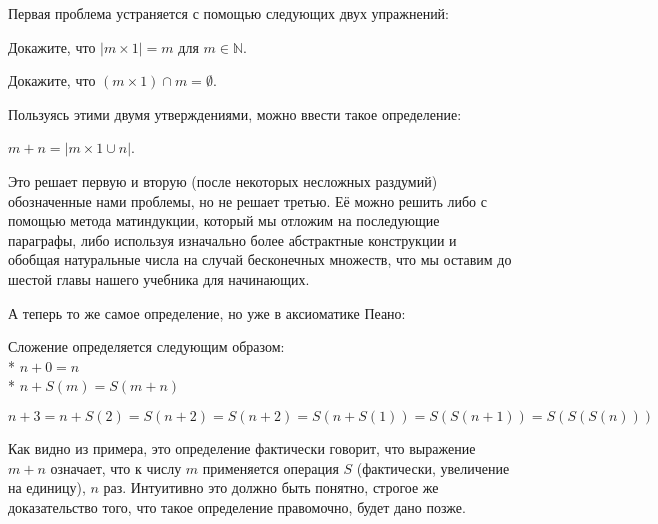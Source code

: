 Первая проблема устраняется с помощью следующих двух упражнений:

\begin{exercise}
Докажите, что $|m\times 1| = m$ для $m\in\mathbb{N}$.
\end{exercise}

\begin{exercise}
Докажите, что $(m\times 1) \cap m = \emptyset$.
\end{exercise}

Пользуясь этими двумя утверждениями, можно ввести такое определение:

\begin{definition}
$m + n = |m\times1 \cup n|$.
\end{definition}

Это решает первую и вторую (после некоторых несложных раздумий) обозначенные нами проблемы, но не решает третью. Её можно решить либо с помощью метода матиндукции, который мы отложим на последующие параграфы, либо используя изначально более абстрактные конструкции и обобщая натуральные числа на случай бесконечных множеств, что мы оставим до шестой главы нашего учебника для начинающих.

А теперь то же самое определение, но уже в аксиоматике Пеано:

\begin{definition}
Сложение определяется следующим образом:\\*
$n + 0 = n$\\*
$n + S(m) = S(m + n)$
\end{definition}

\begin{example}
$$n + 3 = n + S(2) = S(n+2) = S(n+2)
=S(n+S(1)) = S(S(n+1)) = S(S(S(n)))$$
\end{example}

Как видно из примера, это определение фактически говорит, что выражение $m + n$ означает, что к числу $m$ применяется операция $S$ (фактически, увеличение на единицу), $n$ раз. Интуитивно это должно быть понятно, строгое же доказательство того, что такое определение правомочно, будет дано позже.

